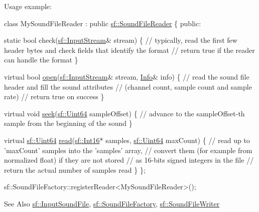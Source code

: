 Usage example\-: 
\begin{DoxyCode}
\textcolor{keyword}{class }MySoundFileReader : \textcolor{keyword}{public} \hyperlink{classsf_1_1_sound_file_reader}{sf::SoundFileReader}
\{
\textcolor{keyword}{public}:

    \textcolor{keyword}{static} \textcolor{keywordtype}{bool} check(\hyperlink{classsf_1_1_input_stream}{sf::InputStream}& stream)
    \{
        \textcolor{comment}{// typically, read the first few header bytes and check fields that identify the format}
        \textcolor{comment}{// return true if the reader can handle the format}
    \}

    \textcolor{keyword}{virtual} \textcolor{keywordtype}{bool} \hyperlink{classsf_1_1_sound_file_reader_aa1d2fee2ba8f359c833ab74590d55935}{open}(\hyperlink{classsf_1_1_input_stream}{sf::InputStream}& stream, \hyperlink{namespacebpt_1_1_net_com_ad2f0a143a2bfc9b23ad2c84f418ee103}{Info}& info)
    \{
        \textcolor{comment}{// read the sound file header and fill the sound attributes}
        \textcolor{comment}{// (channel count, sample count and sample rate)}
        \textcolor{comment}{// return true on success}
    \}

    \textcolor{keyword}{virtual} \textcolor{keywordtype}{void} \hyperlink{classsf_1_1_sound_file_reader_a1e18ade5ffe882bdfa20a2ebe7e2b015}{seek}(\hyperlink{namespacesf_add9ac83466d96b9f50a009b9f4064266}{sf::Uint64} sampleOffset)
    \{
        \textcolor{comment}{// advance to the sampleOffset-th sample from the beginning of the sound}
    \}

    \textcolor{keyword}{virtual} \hyperlink{namespacesf_add9ac83466d96b9f50a009b9f4064266}{sf::Uint64} \hyperlink{classsf_1_1_sound_file_reader_a3b7d86769ea07e24e7b0f0486bed7591}{read}(\hyperlink{namespacesf_a3c8e10435e2a310a7741755e66b5c94e}{sf::Int16}* samples, 
      \hyperlink{namespacesf_add9ac83466d96b9f50a009b9f4064266}{sf::Uint64} maxCount)
    \{
        \textcolor{comment}{// read up to 'maxCount' samples into the 'samples' array,}
        \textcolor{comment}{// convert them (for example from normalized float) if they are not stored}
        \textcolor{comment}{// as 16-bits signed integers in the file}
        \textcolor{comment}{// return the actual number of samples read}
    \}
\};

sf::SoundFileFactory::registerReader<MySoundFileReader>();
\end{DoxyCode}


\begin{DoxySeeAlso}{See Also}
\hyperlink{classsf_1_1_input_sound_file}{sf\-::\-Input\-Sound\-File}, \hyperlink{classsf_1_1_sound_file_factory}{sf\-::\-Sound\-File\-Factory}, \hyperlink{classsf_1_1_sound_file_writer}{sf\-::\-Sound\-File\-Writer} 
\end{DoxySeeAlso}


